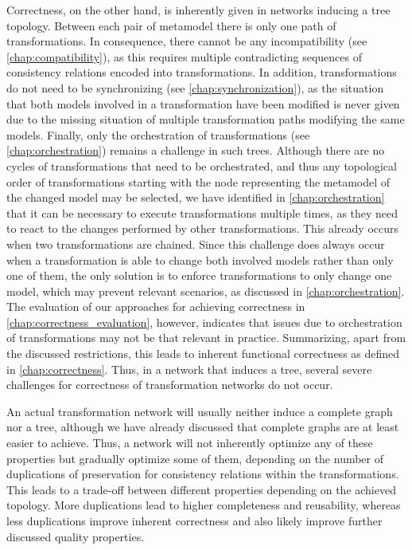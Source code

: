 Correctness, on the other hand, is inherently given in networks inducing a tree topology.
Between each pair of metamodel there is only one path of transformations.
In consequence, there cannot be any incompatibility (see \autoref{chap:compatibility}), as this requires multiple contradicting sequences of consistency relations encoded into transformations.
In addition, transformations do not need to be synchronizing (see \autoref{chap:synchronization}), as the situation that both models involved in a transformation have been modified is never given due to the missing situation of multiple transformation paths modifying the same models.
Finally, only the orchestration of transformations (see \autoref{chap:orchestration}) remains a challenge in such trees.
Although there are no cycles of transformations that need to be orchestrated, and thus any topological order of transformations starting with the node representing the metamodel of the changed model may be selected, we have identified in \autoref{chap:orchestration} that it can be necessary to execute transformations multiple times, as they need to react to the changes performed by other transformations.
This already occurs when two transformations are chained.
Since this challenge does always occur when a transformation is able to change both involved models rather than only one of them, the only solution is to enforce transformations to only change one model, which may prevent relevant scenarios, as discussed in \autoref{chap:orchestration}.
The evaluation of our approaches for achieving correctness in \autoref{chap:correctness_evaluation}, however, indicates that issues due to orchestration of transformations may not be that relevant in practice.
Summarizing, apart from the discussed restrictions, this leads to inherent functional correctness as defined in \autoref{chap:correctness}.
Thus, in a network that induces a tree, several severe challenges for correctness of transformation networks do not occur.


An actual transformation network will usually neither induce a complete graph nor a tree, although we have already discussed that complete graphs are at least easier to achieve.
Thus, a network will not inherently optimize any of these properties but gradually optimize some of them, depending on the number of duplications of preservation for consistency relations within the transformations.
This leads to a trade-off between different properties depending on the achieved topology.
More duplications lead to higher completeness and reusability, whereas less duplications improve inherent correctness and also likely improve further discussed quality properties.

